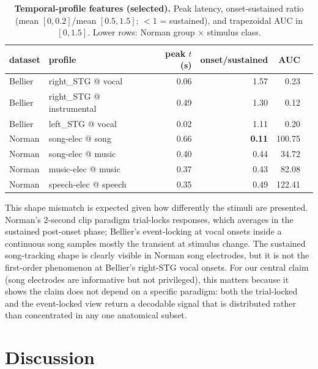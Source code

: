 \documentclass[11pt]{article}
\begin{document}
\begin{table}[h]
\centering\small
\caption{\textbf{Temporal-profile features (selected).} Peak latency, onset-sustained ratio (mean $[0,0.2]$/mean $[0.5,1.5]$; $< 1$ = sustained), and trapezoidal AUC in $[0,1.5]$. Lower rows: Norman group $\times$ stimulus class.}
\label{tab:profiles}
\begin{tabular}{llrrrr}
\toprule
dataset & profile & peak $t$ (s) & onset/sustained & AUC \\
\midrule
Bellier & right\_STG @ vocal        & 0.06 & 1.57 & 0.23 \\
Bellier & right\_STG @ instrumental & 0.49 & 1.30 & 0.12 \\
Bellier & left\_STG  @ vocal        & 0.02 & 1.11 & 0.20 \\
Norman  & song-elec  @ song         & 0.66 & \textbf{0.11} & 100.75 \\
Norman  & song-elec  @ music        & 0.40 & 0.44 & 34.72 \\
Norman  & music-elec @ music        & 0.37 & 0.43 & 82.08 \\
Norman  & speech-elec @ speech      & 0.35 & 0.49 & 122.41 \\
\bottomrule
\end{tabular}
\end{table}

This shape mismatch is expected given how differently the stimuli are presented. Norman's 2-second clip paradigm trial-locks responses, which averages in the sustained post-onset phase; Bellier's event-locking at vocal onsets inside a continuous song samples mostly the transient at stimulus change. The sustained song-tracking shape is clearly visible in Norman song electrodes, but it is not the first-order phenomenon at Bellier's right-STG vocal onsets. For our central claim (song electrodes are informative but not privileged), this matters because it shows the claim does not depend on a specific paradigm: both the trial-locked and the event-locked view return a decodable signal that is distributed rather than concentrated in any one anatomical subset.

\FloatBarrier
\section{Discussion}\label{sec:discussion}
\end{document}

